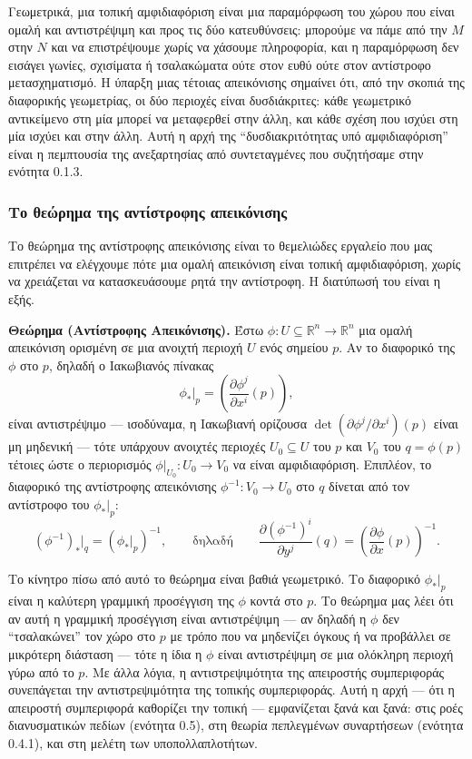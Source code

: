 \documentclass[12pt]{article}
\begin{document}
Γεωμετρικά, μια τοπική αμφιδιαφόριση είναι μια παραμόρφωση του χώρου που είναι ομαλή και αντιστρέψιμη και προς τις δύο κατευθύνσεις: μπορούμε να πάμε από την $M$ στην $N$ και να επιστρέψουμε χωρίς να χάσουμε πληροφορία, και η παραμόρφωση δεν εισάγει γωνίες, σχισίματα ή τσαλακώματα ούτε στον ευθύ ούτε στον αντίστροφο μετασχηματισμό. Η ύπαρξη μιας τέτοιας απεικόνισης σημαίνει ότι, από την σκοπιά της διαφορικής γεωμετρίας, οι δύο περιοχές είναι δυσδιάκριτες: κάθε γεωμετρικό αντικείμενο στη μία μπορεί να μεταφερθεί στην άλλη, και κάθε σχέση που ισχύει στη μία ισχύει και στην άλλη. Αυτή η αρχή της ``δυσδιακριτότητας υπό αμφιδιαφόριση'' είναι η πεμπτουσία της ανεξαρτησίας από συντεταγμένες που συζητήσαμε στην ενότητα 0.1.3.

\subsubsection{Το θεώρημα της αντίστροφης απεικόνισης}

Το θεώρημα της αντίστροφης απεικόνισης είναι το θεμελιώδες εργαλείο που μας επιτρέπει να ελέγχουμε πότε μια ομαλή απεικόνιση είναι τοπική αμφιδιαφόριση, χωρίς να χρειάζεται να κατασκευάσουμε ρητά την αντίστροφη. Η διατύπωσή του είναι η εξής.

\textbf{Θεώρημα (Αντίστροφης Απεικόνισης).} Έστω $\phi: U \subseteq \mathbb{R}^n \to \mathbb{R}^n$ μια ομαλή απεικόνιση ορισμένη σε μια ανοιχτή περιοχή $U$ ενός σημείου $p$. Αν το διαφορικό της $\phi$ στο $p$, δηλαδή ο Ιακωβιανός πίνακας
\[
\phi_*|_p = \left( \frac{\partial \phi^j}{\partial x^i}(p) \right),
\]
είναι αντιστρέψιμο --- ισοδύναμα, η Ιακωβιανή ορίζουσα $\det(\partial \phi^j / \partial x^i)(p)$ είναι μη μηδενική --- τότε υπάρχουν ανοιχτές περιοχές $U_0 \subseteq U$ του $p$ και $V_0$ του $q = \phi(p)$ τέτοιες ώστε ο περιορισμός $\phi|_{U_0}: U_0 \to V_0$ να είναι αμφιδιαφόριση. Επιπλέον, το διαφορικό της αντίστροφης απεικόνισης $\phi^{-1}: V_0 \to U_0$ στο $q$ δίνεται από τον αντίστροφο του $\phi_*|_p$:
\[
(\phi^{-1})_*|_q = (\phi_*|_p)^{-1}, \qquad \text{δηλαδή} \qquad \frac{\partial (\phi^{-1})^i}{\partial y^j}(q) = \left( \frac{\partial \phi}{\partial x}(p) \right)^{-1}.
\]

Το κίνητρο πίσω από αυτό το θεώρημα είναι βαθιά γεωμετρικό. Το διαφορικό $\phi_*|_p$ είναι η καλύτερη γραμμική προσέγγιση της $\phi$ κοντά στο $p$. Το θεώρημα μας λέει ότι αν αυτή η γραμμική προσέγγιση είναι αντιστρέψιμη --- αν δηλαδή η $\phi$ δεν ``τσαλακώνει'' τον χώρο στο $p$ με τρόπο που να μηδενίζει όγκους ή να προβάλλει σε μικρότερη διάσταση --- τότε η ίδια η $\phi$ είναι αντιστρέψιμη σε μια ολόκληρη περιοχή γύρω από το $p$. Με άλλα λόγια, η αντιστρεψιμότητα της απειροστής συμπεριφοράς συνεπάγεται την αντιστρεψιμότητα της τοπικής συμπεριφοράς. Αυτή η αρχή --- ότι η απειροστή συμπεριφορά καθορίζει την τοπική --- εμφανίζεται ξανά και ξανά: στις ροές διανυσματικών πεδίων (ενότητα 0.5), στη θεωρία πεπλεγμένων συναρτήσεων (ενότητα 0.4.1), και στη μελέτη των υποπολλαπλοτήτων.
\end{document}

